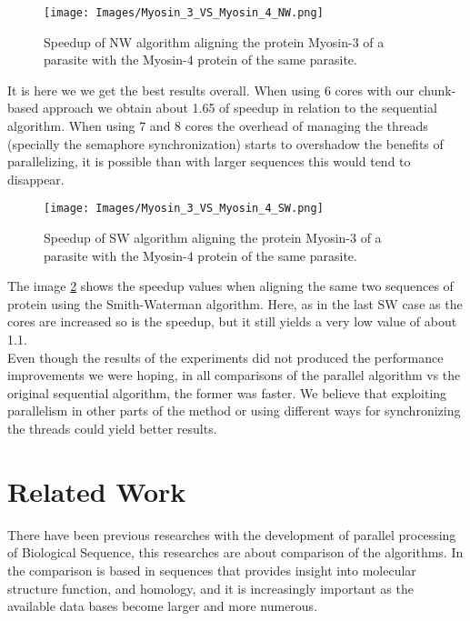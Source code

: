 \documentclass[journal]{IEEEtran}
\begin{document}
\begin{figure}[h]
  \begin{center}
    \texttt{[image: Images/Myosin\_3\_VS\_Myosin\_4\_NW.png]}
  \end{center}
  \caption{Speedup of NW algorithm aligning the protein Myosin-3 of a parasite with the Myosin-4 protein of the same parasite.}
  \label{fig:Myosin3_VS_Myosin4_NW}
\end{figure}

It is here we we get the best results overall. When using 6 cores with our chunk-based approach we obtain about 1.65 of speedup in relation to the sequential algorithm. When using 7 and 8 cores the overhead of managing the threads (specially the semaphore synchronization) starts to overshadow the benefits of parallelizing, it is possible than with larger sequences this would tend to disappear. 

\begin{figure}[h]
  \begin{center}
    \texttt{[image: Images/Myosin\_3\_VS\_Myosin\_4\_SW.png]}
  \end{center}
  \caption{Speedup of SW algorithm aligning the protein Myosin-3 of a parasite with the Myosin-4 protein of the same parasite.}
  \label{fig:Myosin3_VS_Myosin4_SW}
\end{figure}

The image \ref{fig:Myosin3_VS_Myosin4_SW} shows the speedup values when aligning the same two sequences of protein using the Smith-Waterman algorithm. Here, as in the last SW case as the cores are increased so is the speedup, but it still yields a very low value of about 1.1. \\

Even though the results of the experiments did not produced the performance improvements we were hoping, in all comparisons of the parallel algorithm vs the original sequential algorithm, the former was faster. We believe that exploiting parallelism in other parts of the method or using different ways for synchronizing the threads could yield better results.

\section{Related Work}

There have been previous researches with the development of parallel processing of Biological Sequence, this researches are about comparison of the algorithms. In \cite{edmiston1988parallel} the comparison is based in sequences that provides insight into molecular structure function, and homology, and it is increasingly important as the available data bases become larger and more numerous.
\end{document}
